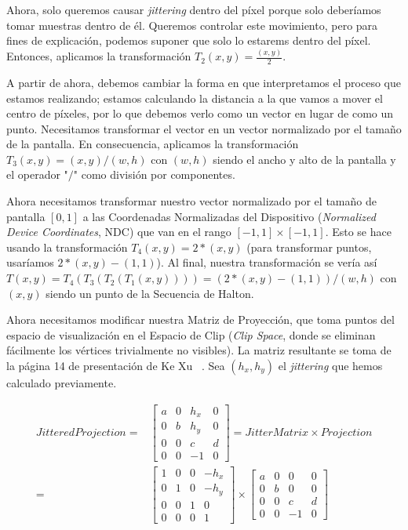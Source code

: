 \documentclass[pregrado]{tesis-usb} %
\begin{document}
Ahora, solo queremos causar \textit{jittering} dentro del píxel porque solo deberíamos tomar muestras dentro de él. Queremos controlar este movimiento, pero para fines de explicación, podemos suponer que solo lo estarems dentro del píxel. Entonces, aplicamos la transformación $T_2 (x, y) = \frac{(x, y)}{2}$.

A partir de ahora, debemos cambiar la forma en que interpretamos el proceso que estamos realizando; estamos calculando la distancia a la que vamos a mover el centro de píxeles, por lo que debemos verlo como un vector en lugar de como un punto. Necesitamos transformar el vector en un vector normalizado por el tamaño de la pantalla. En consecuencia, aplicamos la transformación $T_3 (x, y) = (x, y) / (w, h)$ con $(w, h)$ siendo el ancho y alto de la pantalla y el operador "$/$" como división por componentes.

Ahora necesitamos transformar nuestro vector normalizado por el tamaño de pantalla $ [0, 1] $ a las Coordenadas Normalizadas del Dispositivo (\textit{Normalized Device Coordinates}, NDC) que van en el rango $ [- 1, 1] \times [-1, 1]$. Esto se hace usando la transformación $T_4 (x, y) = 2 * (x, y)$ (para transformar puntos, usaríamos $2 * (x, y) - (1, 1)$). Al final, nuestra transformación se vería así $T (x, y) = T_4 (T_3 (T_2 (T_1 (x, y)))) = (2 * (x, y) - (1, 1)) / (w, h) $ con $ (x, y) $ siendo un punto de la Secuencia de Halton.

Ahora necesitamos modificar nuestra Matriz de Proyección, que toma puntos del espacio de visualización en el Espacio de Clip (\textit{Clip Space}, donde se eliminan fácilmente los vértices trivialmente no visibles). La matriz resultante se toma de la página 14 de presentación de Ke Xu ~\cite{XU2016}. Sea $ (h_x, h_y) $ el \textit{jittering} que hemos calculado previamente.

\begin{equation}
\begin{split}
JitteredProjection = & \begin{bmatrix*} 
a & 0 & h_x & 0 \\ 
0 & b & h_y & 0 \\
0 & 0 & c & d   \\
0 & 0 & -1 & 0   \end{bmatrix*} = JitterMatrix\times Projection \\
= & \begin{bmatrix*} 
1 & 0 & 0 & -h_x \\ 
0 & 1 & 0 & -h_y \\
0 & 0 & 1 & 0   \\
0 & 0 & 0 & 1   \end{bmatrix*} \times \begin{bmatrix*} 
a & 0 & 0 & 0 \\ 
0 & b & 0 & 0 \\
0 & 0 & c & d   \\
0 & 0 & -1 & 0   \end{bmatrix*}
\end{split}
\end{equation}
\end{document}
